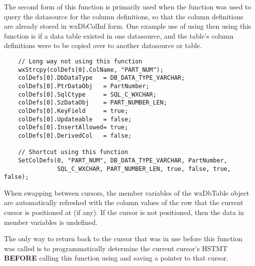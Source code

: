 The second form of this function is primarily used when the
 function was used to query the
datasource for the column definitions, so that the column definitions are
already stored in wxDbColInf form.  One example use of using
 then using this function is if
a data table existed in one datasource, and the table's column definitions
were to be copied over to another datasource or table.


\begin{verbatim}
    // Long way not using this function
    wxStrcpy(colDefs[0].ColName, "PART_NUM");
    colDefs[0].DbDataType   = DB_DATA_TYPE_VARCHAR;
    colDefs[0].PtrDataObj   = PartNumber;
    colDefs[0].SqlCtype     = SQL_C_WXCHAR;
    colDefs[0].SzDataObj    = PART_NUMBER_LEN;
    colDefs[0].KeyField     = true;
    colDefs[0].Updateable   = false;
    colDefs[0].InsertAllowed= true;
    colDefs[0].DerivedCol   = false;

    // Shortcut using this function
    SetColDefs(0, "PART_NUM", DB_DATA_TYPE_VARCHAR, PartNumber,
               SQL_C_WXCHAR, PART_NUMBER_LEN, true, false, true, false);
\end{verbatim}

\label{wxdbtablesetcursor}





When swapping between cursors, the member variables of the wxDbTable object
are automatically refreshed with the column values of the row that the
current cursor is positioned at (if any).  If the cursor is not positioned,
then the data in member variables is undefined.

The only way to return back to the cursor that was in use before this
function was called is to programmatically determine the current cursor's HSTMT
{\bf BEFORE} calling this function using 
and saving a pointer to that cursor.

